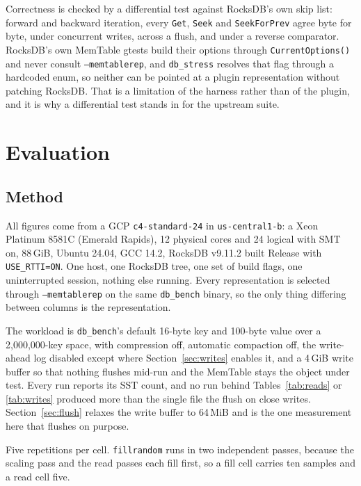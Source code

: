\documentclass[conference]{IEEEtran}
\begin{document}
Correctness is checked by a differential test against RocksDB's own skip list:
forward and backward iteration, every \texttt{Get}, \texttt{Seek} and
\texttt{SeekForPrev} agree byte for byte, under concurrent writes, across a flush,
and under a reverse comparator. RocksDB's own MemTable gtests build their options
through \texttt{CurrentOptions()} and never consult \texttt{--memtablerep}, and
\texttt{db\_stress} resolves that flag through a hardcoded enum, so neither can be
pointed at a plugin representation without patching RocksDB. That is a limitation
of the harness rather than of the plugin, and it is why a differential test stands
in for the upstream suite.

\section{Evaluation}
\label{sec:evaluation}

\subsection{Method}

All figures come from a GCP \texttt{c4-standard-24} in \texttt{us-central1-b}: a
Xeon Platinum 8581C (Emerald Rapids), 12 physical cores and 24 logical with SMT
on, 88\,GiB, Ubuntu 24.04, GCC 14.2, RocksDB v9.11.2 built Release with
\texttt{USE\_RTTI=ON}. One host, one RocksDB tree, one set of build flags, one
uninterrupted session, nothing else running. Every representation is selected
through \texttt{--memtablerep} on the same \texttt{db\_bench} binary, so the only
thing differing between columns is the representation.

The workload is \texttt{db\_bench}'s default 16-byte key and 100-byte value over a
2{,}000{,}000-key space, with compression off, automatic compaction off, the
write-ahead log disabled except where Section~\ref{sec:writes} enables it, and a
4\,GiB write buffer so that nothing flushes mid-run and the MemTable stays the
object under test. Every run reports its SST count, and no run behind
Tables~\ref{tab:reads} or \ref{tab:writes} produced more than the single file the
flush on close writes. Section~\ref{sec:flush} relaxes the write buffer to 64\,MiB
and is the one measurement here that flushes on purpose.

Five repetitions per cell. \texttt{fillrandom} runs in two independent passes,
because the scaling pass and the read passes each fill first, so a fill cell
carries ten samples and a read cell five.
\end{document}

